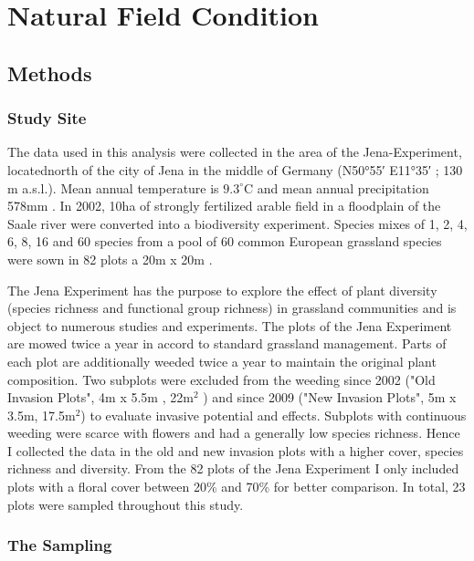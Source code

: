 \label{ch:methods}

\section{Natural Field Condition} 

\subsection{Methods}

\subsubsection*{Study Site}

The data used in this analysis were collected in the area of the Jena-Experiment, locatednorth of the city of Jena in the middle of Germany (N\ang{50;55;} E\ang{11;35;} ; 130 m a.s.l.). Mean annual temperature is $9.3 ^\circ\text{C}$ and mean annual precipitation 578mm \citep{kluge2000klima}.
In 2002, 10ha of strongly fertilized arable field in a floodplain of the Saale river were converted into a biodiversity experiment. Species mixes of 1, 2, 4, 6, 8, 16 and 60 species from a pool of 60 common European grassland species were sown in 82 plots a 20m x 20m \citep{roscher2004role}. 

The Jena Experiment has the purpose to explore the effect of plant diversity (species richness and functional group richness) in grassland communities and is object to numerous studies and experiments.
The plots of the Jena Experiment are mowed twice a year in accord to standard grassland management. Parts of each plot are additionally weeded twice a year to maintain the original plant composition. Two subplots were excluded from the weeding since 2002 ("Old Invasion Plots", 4m x 5.5m , 22m$^{2}$ ) and since 2009 ("New Invasion Plots", 5m x 3.5m, 17.5m$^{2}$) to evaluate invasive potential and effects. 
Subplots with continuous weeding were scarce with flowers and had a generally low species richness. Hence I collected the data in the old and new invasion plots with a higher cover, species richness and diversity. From the 82 plots of the Jena Experiment I only included plots with a floral cover between 20\% and 70\% for better comparison. In total, 23 plots were sampled throughout this study. 

\subsubsection*{The Sampling}

